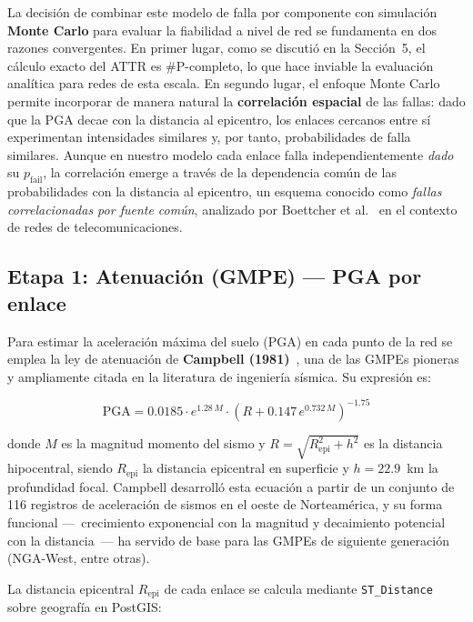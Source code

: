 \documentclass[12pt,a4paper]{article}
\begin{document}
La decisión de combinar este modelo de falla por componente con simulación
\textbf{Monte Carlo} para evaluar la fiabilidad a nivel de red se
fundamenta en dos razones convergentes.  En primer lugar, como se discutió
en la Sección~5, el cálculo exacto del ATTR es \#P-completo, lo que hace
inviable la evaluación analítica para redes de esta escala.  En segundo
lugar, el enfoque Monte Carlo permite incorporar de manera natural la
\textbf{correlación espacial} de las fallas: dado que la PGA decae con la
distancia al epicentro, los enlaces cercanos entre sí experimentan
intensidades similares y, por tanto, probabilidades de falla similares.
Aunque en nuestro modelo cada enlace falla independientemente \textit{dado}
su $p_{\text{fail}}$, la correlación emerge a través de la dependencia
común de las probabilidades con la distancia al epicentro, un esquema
conocido como \textit{fallas correlacionadas por fuente común}, analizado
por Boettcher et al.~\cite{boettcher2009} en el contexto de redes de
telecomunicaciones.

\subsection{Etapa 1: Atenuación (GMPE) --- PGA por enlace}

Para estimar la aceleración máxima del suelo (PGA) en cada punto de la
red se emplea la ley de atenuación de \textbf{Campbell
(1981)}~\cite{campbell1981}, una de las GMPEs pioneras y ampliamente
citada en la literatura de ingeniería sísmica.  Su expresión es:

\begin{equation}
\text{PGA} = 0.0185 \cdot e^{1.28\,M} \cdot
  \left(R + 0.147\,e^{0.732\,M}\right)^{-1.75}
\label{eq:campbell}
\end{equation}

donde $M$ es la magnitud momento del sismo y $R = \sqrt{R_{\text{epi}}^2
+ h^2}$ es la distancia hipocentral, siendo $R_{\text{epi}}$ la distancia
epicentral en superficie y $h = 22.9$~km la profundidad focal.  Campbell
desarrolló esta ecuación a partir de un conjunto de 116 registros de
aceleración de sismos en el oeste de Norteamérica, y su forma funcional
---~crecimiento exponencial con la magnitud y decaimiento potencial con la
distancia~--- ha servido de base para las GMPEs de siguiente generación
(NGA-West, entre otras).

La distancia epicentral $R_{\text{epi}}$ de cada enlace se calcula
mediante \texttt{ST\_Distance} sobre geografía en PostGIS:
\end{document}
